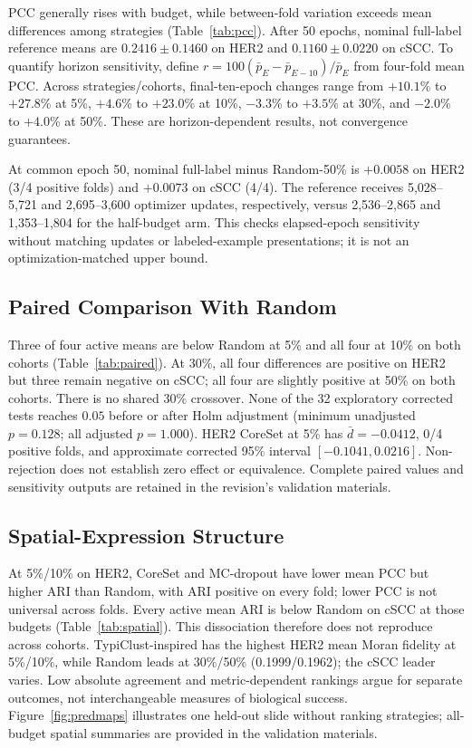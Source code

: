 PCC generally rises with budget, while between-fold variation exceeds mean differences among strategies (Table~\ref{tab:pcc}). After 50 epochs, nominal full-label reference means are $0.2416\pm0.1460$ on HER2 and $0.1160\pm0.0220$ on cSCC. To quantify horizon sensitivity, define $r=100(\bar p_E-\bar p_{E-10})/\bar p_E$ from four-fold mean PCC. Across strategies/cohorts, final-ten-epoch changes range from $+10.1$\% to $+27.8$\% at 5\%, $+4.6$\% to $+23.0$\% at 10\%, $-3.3$\% to $+3.5$\% at 30\%, and $-2.0$\% to $+4.0$\% at 50\%. These are horizon-dependent results, not convergence guarantees.


At common epoch 50, nominal full-label minus Random-50\% is $+0.0058$ on HER2 (3/4 positive folds) and $+0.0073$ on cSCC (4/4). The reference receives 5,028--5,721 and 2,695--3,600 optimizer updates, respectively, versus 2,536--2,865 and 1,353--1,804 for the half-budget arm. This checks elapsed-epoch sensitivity without matching updates or labeled-example presentations; it is not an optimization-matched upper bound.

\subsection{Paired Comparison With Random}

Three of four active means are below Random at 5\% and all four at 10\% on both cohorts (Table~\ref{tab:paired}). At 30\%, all four differences are positive on HER2 but three remain negative on cSCC; all four are slightly positive at 50\% on both cohorts. There is no shared 30\% crossover. None of the 32 exploratory corrected tests reaches $0.05$ before or after Holm adjustment (minimum unadjusted $p=0.128$; all adjusted $p=1.000$). HER2 CoreSet at 5\% has $\bar d=-0.0412$, 0/4 positive folds, and approximate corrected 95\% interval $[-0.1041,0.0216]$. Non-rejection does not establish zero effect or equivalence. Complete paired values and sensitivity outputs are retained in the revision's validation materials.


\subsection{Spatial-Expression Structure}

At 5\%/10\% on HER2, CoreSet and MC-dropout have lower mean PCC but higher ARI than Random, with ARI positive on every fold; lower PCC is not universal across folds. Every active mean ARI is below Random on cSCC at those budgets (Table~\ref{tab:spatial}). This dissociation therefore does not reproduce across cohorts. TypiClust-inspired has the highest HER2 mean Moran fidelity at 5\%/10\%, while Random leads at 30\%/50\% (0.1999/0.1962); the cSCC leader varies. Low absolute agreement and metric-dependent rankings argue for separate outcomes, not interchangeable measures of biological success. Figure~\ref{fig:predmaps} illustrates one held-out slide without ranking strategies; all-budget spatial summaries are provided in the validation materials.

